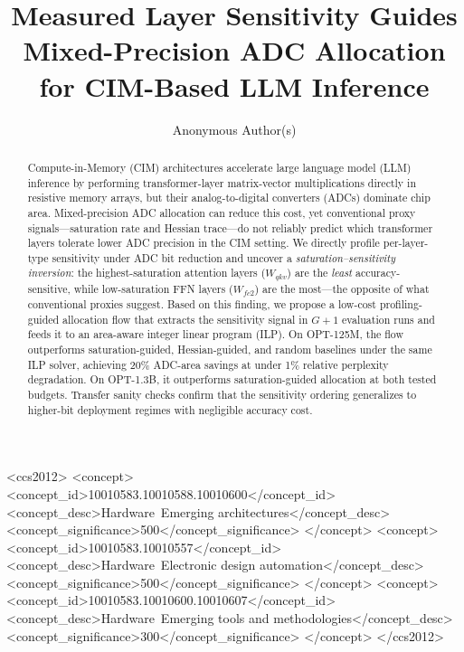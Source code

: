 \documentclass[sigconf,review,anonymous]{acmart}
\begin{document}
\title{Measured Layer Sensitivity Guides Mixed-Precision ADC Allocation for CIM-Based LLM Inference}

\author{Anonymous Author(s)}

\begin{abstract}
Compute-in-Memory (CIM) architectures accelerate large language model (LLM) inference by performing transformer-layer matrix-vector multiplications directly in resistive memory arrays, but their analog-to-digital converters (ADCs) dominate chip area.
Mixed-precision ADC allocation can reduce this cost, yet conventional proxy signals---saturation rate and Hessian trace---do not reliably predict which transformer layers tolerate lower ADC precision in the CIM setting.
We directly profile per-layer-type sensitivity under ADC bit reduction and uncover a \emph{saturation--sensitivity inversion}: the highest-saturation attention layers ($W_{qkv}$) are the \emph{least} accuracy-sensitive, while low-saturation FFN layers ($W_{fc2}$) are the most---the opposite of what conventional proxies suggest.
Based on this finding, we propose a low-cost profiling-guided allocation flow that extracts the sensitivity signal in $G{+}1$ evaluation runs and feeds it to an area-aware integer linear program (ILP).
On OPT-125M, the flow outperforms saturation-guided, Hessian-guided, and random baselines under the same ILP solver, achieving 20\% ADC-area savings at under 1\% relative perplexity degradation.
On OPT-1.3B, it outperforms saturation-guided allocation at both tested budgets.
Transfer sanity checks confirm that the sensitivity ordering generalizes to higher-bit deployment regimes with negligible accuracy cost.
\end{abstract}

\begin{CCSXML}
<ccs2012>
<concept>
<concept_id>10010583.10010588.10010600</concept_id>
<concept_desc>Hardware~Emerging architectures</concept_desc>
<concept_significance>500</concept_significance>
</concept>
<concept>
<concept_id>10010583.10010557</concept_id>
<concept_desc>Hardware~Electronic design automation</concept_desc>
<concept_significance>500</concept_significance>
</concept>
<concept>
<concept_id>10010583.10010600.10010607</concept_id>
<concept_desc>Hardware~Emerging tools and methodologies</concept_desc>
<concept_significance>300</concept_significance>
</concept>
</ccs2012>
\end{CCSXML}

\end{document}
